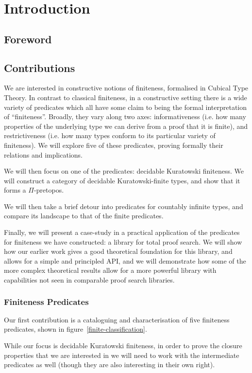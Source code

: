 \chapter{Introduction}
\section{Foreword}
\section{Contributions}
We are interested in constructive notions of finiteness, formalised in Cubical
Type Theory.
In contrast to classical finiteness, in a constructive setting there is a wide
variety of predicates which all have some claim to being the formal
interpretation of ``finiteness''.
Broadly, they vary along two axes: informativeness (i.e. how many properties
of the underlying type we can derive from a proof that it is finite), and
restrictiveness (i.e. how many types conform to its particular variety of
finiteness).
We will explore five of these predicates, proving formally their relations and
implications.



We will then focus on one of the predicates: decidable Kuratowski finiteness.
We will construct a category of decidable Kuratowski-finite types, and show that
it forms a \(\Pi\)-pretopos.

We will then take a brief detour into predicates for countably infinite types,
and compare its landscape to that of the finite predicates.

Finally, we will present a case-study in a practical application of the
predicates for finiteness we have constructed: a library for total proof search.
We will show how our earlier work gives a good theoretical foundation for this
library, and allows for a simple and principled API, and we will demonstrate how
some of the more complex theoretical results allow for a more powerful library
with capabilities not seen in comparable proof search libraries.


\subsection{Finiteness Predicates}
Our first contribution is a cataloguing and characterisation of five finiteness
predicates, shown in figure~\ref{finite-classification}.

While our focus is decidable Kuratowski finiteness, in order to prove the
closure properties that we are interested in we will need to work with the
intermediate predicates as well (though they are also interesting in their own
right).

